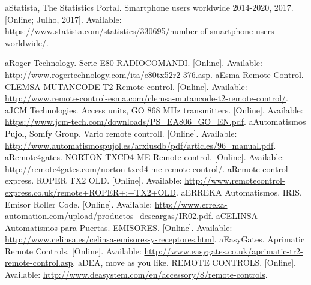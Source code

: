 \begin{thebibliography}{1}
	\bibitem aStatista, The Statistics Portal. Smartphone users worldwide 2014-2020, 2017. [Online; Julho, 2017]. Available: \href{https://www.statista.com/statistics/330695/number-of-smartphone-users-worldwide/}{https://www.statista.com/statistics/330695/number-of-smartphone-users-worldwide/}.
	\label{estatiscasmart}
	
	\bibitem aRoger Technology. Serie E80 RADIOCOMANDI. [Online]. Available: \href{http://www.rogertechnology.com/ita/e80tx52r2-376.asp}{http://www.rogertechnology.com/ita/e80tx52r2-376.asp}.
	\label{rogercomando}
	\bibitem aEsma Remote Control. CLEMSA MUTANCODE T2 Remote control. [Online]. Available: \href{http://www.remote-control-esma.com/clemsa-mutancode-t2-remote-control/}{http://www.remote-control-esma.com/clemsa-mutancode-t2-remote-control/}.
	\label{mutancodecomando}
	\bibitem aJCM Technologies. Access units, GO 868 MHz transmitters. [Online]. Available: \href{https://www.jcm-tech.com/downloads/PS_EA806_GO_EN.pdf}{https://www.jcm-tech.com/downloads/PS\_EA806\_GO\_EN.pdf}.
	\label{jcmcomando}
	\bibitem aAutomatismos Pujol, Somfy Group. Vario remote controll. [Online]. Available: \href{http://www.automatismospujol.es/arxiusdb/pdf/articles/96_manual.pdf}{http://www.automatismospujol.es/arxiusdb/pdf/articles/96\_manual.pdf}.
	\bibitem aRemote4gates. NORTON TXCD4 ME Remote control. [Online]. Available: \href{http://remote4gates.com/norton-txcd4-me-remote-control/}{http://remote4gates.com/norton-txcd4-me-remote-control/}.
	\bibitem aRemote control express. ROPER TX2 OLD. [Online]. Available: \href{http://www.remotecontrol-express.co.uk/remote+ROPER+:+TX2+OLD}{http://www.remotecontrol-express.co.uk/remote+ROPER+:+TX2+OLD}.
	\bibitem aERREKA Automatismos. IRIS, Emisor Roller Code. [Online]. Available: \href{http://www.erreka-automation.com/upload/productos_descargas/IR02.pdf}{http://www.erreka-automation.com/upload/productos\_descargas/IR02.pdf}.
	\bibitem aCELINSA Automatismos para Puertas. EMISORES. [Online]. Available: \href{http://www.celinsa.es/celinsa-emisores-y-receptores.html}{http://www.celinsa.es/celinsa-emisores-y-receptores.html}.
	\bibitem aEasyGates. Aprimatic Remote Controls. [Online]. Available: \href{http://www.easygates.co.uk/aprimatic-tr2-remote-control.asp}{http://www.easygates.co.uk/aprimatic-tr2-remote-control.asp}.
	\bibitem aDEA, move as you like. REMOTE CONTROLS. [Online]. Available: \href{http://www.deasystem.com/en/accessory/8/remote-controls}{http://www.deasystem.com/en/accessory/8/remote-controls}.

\end{thebibliography}
